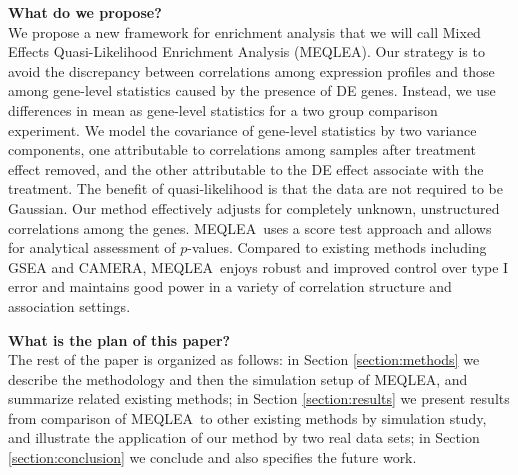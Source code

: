 \documentclass[useAMS,usenatbib, galley]{biom}
\newcommand{\OurMethod}{MEQLEA}
\begin{document}
	
	
	\textbf{What do we propose?} \\
	We propose a new framework for enrichment analysis that we will call Mixed Effects Quasi-Likelihood Enrichment Analysis (\OurMethod). Our strategy is to avoid the discrepancy between correlations among expression profiles and those among gene-level statistics caused by the presence of DE genes. Instead, we use differences in mean as gene-level statistics for a two group comparison experiment. We model the covariance of gene-level statistics by two variance components, one attributable to correlations among samples after treatment effect removed, and the other attributable to the DE effect associate with the treatment. The benefit of quasi-likelihood is that the data are not required to be Gaussian. Our method effectively adjusts for completely unknown, unstructured correlations among the genes. \OurMethod~uses a score test approach and allows for analytical assessment of $p$-values. Compared to existing methods including GSEA and CAMERA, \OurMethod~enjoys robust and improved control over type I error and maintains good power in a variety of correlation structure and association settings. 
	
	\textbf{What is the plan of this paper?} \\
	The rest of the paper is organized as follows: in Section \ref{section:methods} we describe the methodology and then the simulation setup of \OurMethod, and summarize related existing methods; in Section \ref{section:results} we present results from comparison of \OurMethod~to other existing methods by simulation study, and illustrate the application of our method by two real data sets; in Section \ref{section:conclusion} we conclude and also specifies the future work.

	
	
\end{document}

